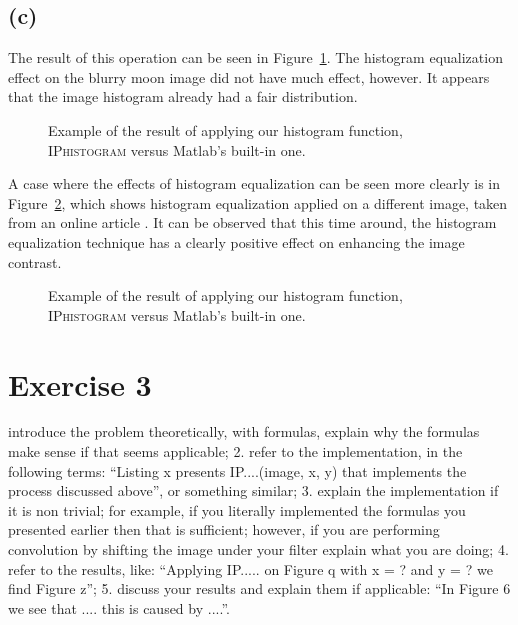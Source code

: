 \documentclass{article}
\begin{document}
\subsection*{(c)} The result of this operation can be seen in Figure~\ref{fig:histeq}. The histogram equalization effect on the blurry moon image did not have much effect, however. It appears that the image histogram already had a fair distribution.
\begin{figure}[ht]
    \centering
    
    \caption{Example of the result of applying our histogram function, \textsc{IPhistogram} versus Matlab's built-in one.}
    \label{fig:histeq}
\end{figure}

A case where the effects of histogram equalization can be seen more clearly is in Figure~\ref{fig:histeq_2}, which shows histogram equalization applied on a different image, taken from an online article \citep{wiki:Histogram_equalization}. It can be observed that this time around, the histogram equalization technique has a clearly positive effect on enhancing the image contrast.

\begin{figure}[ht]
    \centering
    
    \caption{Example of the result of applying our histogram function, \textsc{IPhistogram} versus Matlab's built-in one.}
    \label{fig:histeq_2}
\end{figure}


\section*{Exercise 3}

introduce the problem theoretically, with formulas, explain why the formulas make sense if
that seems applicable;
2. refer to the implementation, in the following terms: “Listing x presents IP....(image, x, y) that
implements the process discussed above”, or something similar;
3. explain the implementation if it is non trivial; for example, if you literally implemented the
formulas you presented earlier then that is sufficient; however, if you are performing convolution by shifting the image under your filter explain what you are doing;
4. refer to the results, like: “Applying IP..... on Figure q with x = ? and y = ? we find Figure z”;
5. discuss your results and explain them if applicable: “In Figure 6 we see that .... this is caused
by ....”.
\end{document}
